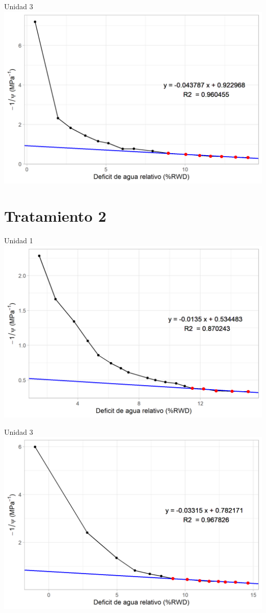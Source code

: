 \documentclass[
  letterpaper,
  DIV=11,
  numbers=noendperiod]{scrreprt}
\begin{document}
Unidad 3 \includegraphics{figuras/06_tlp/tlp_rio_claro_T1_3.png}

\chapter{Tratamiento 2}

Unidad 1 \includegraphics{figuras/06_tlp/tlp_rio_claro_T2_1.png}

Unidad 3 \includegraphics{figuras/06_tlp/tlp_rio_claro_T2_3.png}
\end{document}
